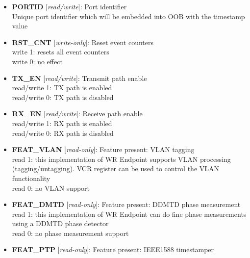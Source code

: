\begin{itemize}
\item \begin{small}
{\bf 
PORTID
} [\emph{read/write}]: Port identifier
\\
Unique port identifier which will be embedded into OOB with the timestamp value
\end{small}
\item \begin{small}
{\bf 
RST\_CNT
} [\emph{write-only}]: Reset event counters
\\
write 1: resets all event counters \\                       write 0: no effect
\end{small}
\item \begin{small}
{\bf 
TX\_EN
} [\emph{read/write}]: Transmit path enable
\\
read/write 1: TX path is enabled\\										 read/write 0: TX path is disabled
\end{small}
\item \begin{small}
{\bf 
RX\_EN
} [\emph{read/write}]: Receive path enable
\\
read/write 1: RX path is enabled\\			                read/write 0: RX path is disabled
\end{small}
\item \begin{small}
{\bf 
FEAT\_VLAN
} [\emph{read-only}]: Feature present: VLAN tagging
\\
read 1: this implementation of WR Endpoint supports VLAN processing (tagging/untagging). VCR register can be used to control the VLAN functionality \\                      read 0: no VLAN support
\end{small}
\item \begin{small}
{\bf 
FEAT\_DMTD
} [\emph{read-only}]: Feature present: DDMTD phase measurement
\\
read 1: this implementation of WR Endpoint can do fine phase measurements using a DDMTD phase detector\\                      read 0: no phase measurement support
\end{small}
\item \begin{small}
{\bf 
FEAT\_PTP
} [\emph{read-only}]: Feature present: IEEE1588 timestamper

\end{small}
\end{itemize}
